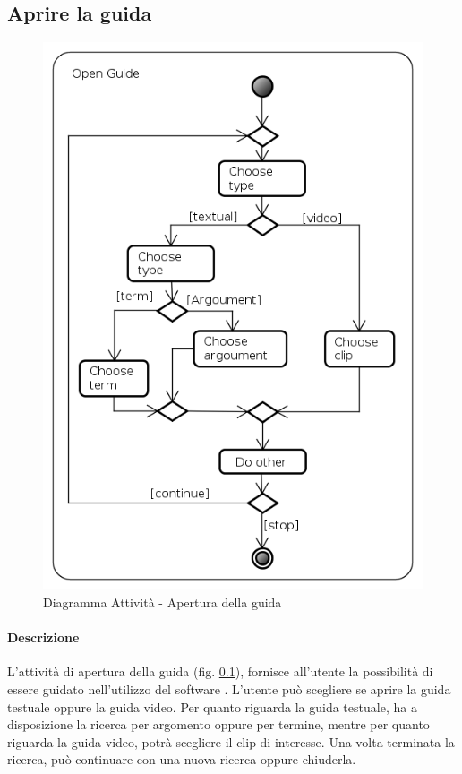 \subsection{Aprire la guida}
\label{guide}
\begin{figure}[!h]
\centering
\includegraphics[width=0.6\linewidth]{./Content/Immagini/Open_Guide}
\caption{Diagramma Attività - Apertura della guida}
\label{openG}
\end{figure}
\paragraph{Descrizione\\}
L'attività di apertura della guida (fig. \ref{guide}), fornisce all'utente la possibilità di essere guidato nell'utilizzo del software \project{}. L'utente può scegliere se aprire la guida testuale oppure la guida video. Per quanto riguarda la guida testuale, ha a disposizione la ricerca per argomento oppure per termine, mentre per quanto riguarda la guida video, potrà scegliere il clip di interesse. Una volta terminata la ricerca, può continuare con una nuova ricerca oppure chiuderla.
